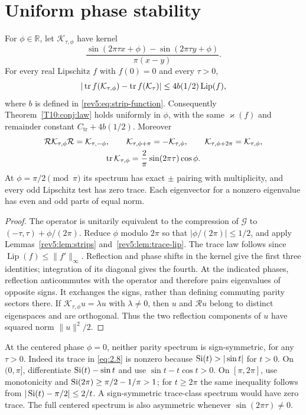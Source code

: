 \section{Uniform phase stability}
\begin{proposition}\label{v6:prop:allphase}\label{prop:T5b:symmetries}
For $\phi\in\mathbb R$, let $\mathcal K_{\tau,\phi}$ have kernel
\[
 \frac{\sin(2\pi\tau x+\phi)-\sin(2\pi\tau y+\phi)}{\pi(x-y)}.
\]
For every real Lipschitz $f$ with $f(0)=0$ and every $\tau>0$,
\[
 |\operatorname{tr} f(\mathcal K_{\tau,\phi})-\operatorname{tr} f(\mathcal K_\tau)|
 \le4b(1/2)\operatorname{Lip}(f),
\]
where $b$ is defined in \eqref{rev5:eq:strip-function}.
Consequently Theorem~\ref{T10:conj:law} holds uniformly in $\phi$,
with the same $\varkappa(f)$ and remainder constant
$C_{\mathrm{tr}}+4b(1/2)$.  Moreover
\begin{equation}\label{v6:eq:phasesym}
 \begin{gathered}
 \mathcal R\mathcal K_{\tau,\phi}\mathcal R=\mathcal K_{\tau,-\phi},\qquad
 \mathcal K_{\tau,\phi+\pi}=-\mathcal K_{\tau,\phi},\qquad
 \mathcal K_{\tau,\phi+2\pi}=\mathcal K_{\tau,\phi},\\
 \operatorname{tr}\mathcal K_{\tau,\phi}=\frac2\pi\sin(2\pi\tau)\cos\phi.
 \end{gathered}
\end{equation}
At $\phi=\pi/2\pmod\pi$ its spectrum has exact $\pm$ pairing with
multiplicity, and every odd Lipschitz test has zero trace.  Each eigenvector
for a nonzero eigenvalue has even and odd parts of equal norm.
\end{proposition}
\begin{proof}
The operator is unitarily equivalent to the compression of $\mathcal G$
to $(-\tau,\tau)+\phi/(2\pi)$.  Reduce $\phi$ modulo $2\pi$ so that
$|\phi/(2\pi)|\le1/2$, and apply Lemmas~\ref{rev5:lem:strips}
and~\ref{rev5:lem:trace-lip}.  The trace law follows since
$\operatorname{Lip}(f)\le\|f'\|_\infty$.
Reflection and phase shifts in the kernel give the first three identities;
integration of its diagonal gives the fourth.  At the indicated phases,
reflection anticommutes with the operator and therefore pairs eigenvalues
of opposite signs.  It exchanges the signs, rather than defining commuting
parity sectors there.  If $\mathcal K_{\tau,\phi}u=\lambda u$ with
$\lambda\ne0$, then $u$ and $\mathcal Ru$ belong to distinct eigenspaces
and are orthogonal.  Thus the two reflection components of $u$ have
squared norm $\|u\|^2/2$.
\end{proof}
At the centered phase $\phi=0$, neither parity spectrum is sign-symmetric,
for any $\tau>0$.  Indeed its trace in \eqref{eq:2.8} is nonzero because
$\operatorname{Si}(t)>|\sin t|$ for $t>0$.  On $(0,\pi]$, differentiate
$\operatorname{Si}(t)-\sin t$ and use $\sin t-t\cos t>0$.
On $[\pi,2\pi]$, use monotonicity and
$\operatorname{Si}(2\pi)\ge\pi/2-1/\pi>1$; for $t\ge2\pi$ the same inequality
follows from $|\operatorname{Si}(t)-\pi/2|\le2/t$.
A sign-symmetric trace-class spectrum would have zero trace.
The full centered spectrum is also asymmetric whenever $\sin(2\pi\tau)\ne0$.


